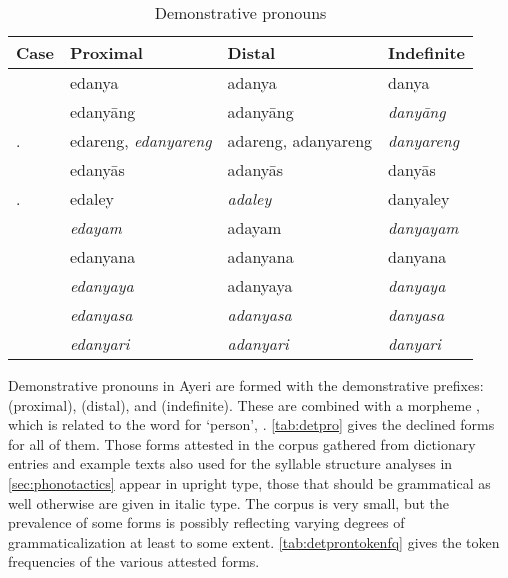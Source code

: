 \begin{table}[tp]\centering
\caption{Demonstrative pronouns}

\begin{tabu} to \linewidth{l X[c] X[c] X[c]}
\tableheaderfont\toprule

Case
	& Proximal
	& Distal
	& Indefinite
	\\
\toprule

\Top{}
	& edanya
	& adanya
	& danya
	\\
	
\midrule
	
\Aarg{}
	& edanyāng
	& adanyāng
	& \emph{danyāng}
	\\

\Aarg{}.\Inan{}
	& edareng, \emph{edanyareng}
	& adareng, adanyareng
	& \emph{danyareng}
	\\

\Parg{}
	& edanyās
	& adanyās
	& danyās
	\\

\Parg{}.\Inan{}
	& edaley
	& \emph{adaley}
	& danyaley
	\\

\Dat{}
	& \emph{edayam}
	& adayam
	& \emph{danyayam}
	\\

\midrule

\Gen{}
	& edanyana
	& adanyana
	& danyana
	\\
	
\Loc{}
	& \emph{edanyaya}
	& adanyaya
	& \emph{danyaya}
	\\
	
\Caus{}
	& \emph{edanyasa}
	& \emph{adanyasa}
	& \emph{danyasa}
	\\
	
\Ins{}
	& \emph{edanyari}
	& \emph{adanyari}
	& \emph{danyari}
	\\

\bottomrule
\end{tabu}
\label{tab:detpro}
\end{table}

Demonstrative pronouns in Ayeri are formed with the demonstrative 
prefixes:  (proximal),  
(distal), and  (indefinite). These are combined with a 
morpheme , which is related to the word for `person', 
. \autoref{tab:detpro} gives the declined forms for all of 
them. Those forms attested in the corpus gathered from dictionary entries and 
example texts also used for the syllable structure analyses in 
\autoref{sec:phonotactics} appear in upright type, those that should be 
grammatical as well otherwise are given in italic type. The corpus is very 
small, but the prevalence of some forms is possibly reflecting varying degrees 
of grammaticalization at least to some extent. \autoref{tab:detprontokenfq} 
gives the token frequencies of the various attested forms.

